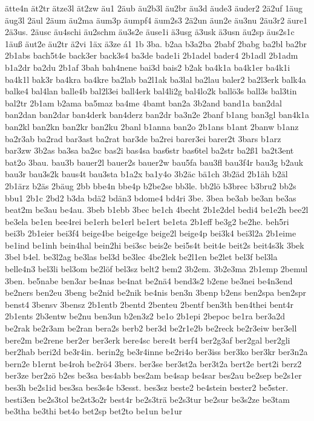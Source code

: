 {ätte4n
ät2tr
ätze3l
ät2zw
äu1
2äub
äu2b3l
äu2br
äu3d
äude3
äuder2
2ä2uf
1äug
äug3l
2äul
2äum
äu2ma
äum3p
äumpf4
äum2s3
2ä2un
äun2e
äu3nu
2äu3r2
äure1
2ä3us.
2äusc
äu4schi
äu2schm
äu3s2e
äuse1i
ä3usg
ä3usk
ä3usn
äu2sp
äus2s1c
1äuß
äut2e
äu2tr
ä2vi
1äx
ä3ze
á1
1b
3ba.
b2aa
b3a2ba
2babf
2babg
ba2bl
ba2br
2b1abs
bach5t4e
back3er
back3s4
ba3de
bade1i
2b1adel
bader4
2b1adl
2b1adm
b1a2dr
ba2du
2b1af
3bah
bah4nene
bai3d
bais2
b2ak
ba4k1a
ba4k1er
ba4k1i
ba4k1l
bak3r
ba4kra
ba4kre
ba2lab
ba2l1ak
ba3lal
ba2lau
baler2
ba2l3erk
balk4a
balke4
bal4lan
balle4b
bal2l3ei
ball4erk
bal4li2g
bal4lo2k
ballö3s
ball3s
bal3tin
bal2tr
2b1am
b2ama
ba5maz
ba4me
4bamt
ban2a
3b2and
band1a
ban2dal
ban2dan
ban2dar
ban4derk
ban4derz
ban2dr
ba3n2e
2banf
b1ang
ban3gl
ban4k1a
ban2kl
ban2kn
ban2kr
ban2ku
2banl
b1anna
ban2o
2b1ans
b1ant
2banw
b1anz
ba2r3ab
ba2rad
bar3ast
ba2rat
bar3de
ba2rei
barer3ei
barer2t
3bars
b1arz
bar3zw
3b2as
ba3sa
ba2sc
bas2i
bas4sa
bas6str
bas6tel
ba2str
ba2ß1
ba2t3ent
bat2o
3bau.
bau3b
bauer2l
bauer2s
bauer2w
bau5fa
bau3fl
bau3f4r
bau3g
b2auk
bau3r
bau3s2k
baus4t
bau3sta
b1a2x
ba1y4o
3b2äc
bä1ch
3b2äd
2b1äh
b2äl
2b1ärz
b2äs
2bäug
2bb
bbe4n
bbe4p
b2be2se
bb3le.
bb2lö
b3brec
b3bru2
bb2s
bbu1
2b1c
2bd2
b3da
bdä2
bdän3
bdome4
bd4ri
3be.
3bea
be3ab
be3an
be3as
beat2m
be3au
be4au.
3beb
b1ebb
3bec
be1ch
4becht
2b1e2del
bedi4
be1e2h
bee2l
be3ela
be1en
bee4rei
be1erh
be1erl
be1ert
be1eta
2b1eff
be3g2
be2he.
beh5ri
bei3b
2b1eier
bei3f4
beige4be
beige4ge
beige2l
beige4p
bei3k4
bei3l2a
2b1eime
be1ind
be1inh
bein4hal
bein2hi
bei3sc
beis2e
bei5s4t
beit4e
beit2s
beit4s3k
3bek
3bel
b4el.
be3l2ag
be3las
bel3d
be3lec
4be2lek
be2l1en
be2let
bel3f
bel3la
belle4n3
bel3li
bel3om
be2löf
bel3sz
belt2
bem2
3b2em.
3b2e3ma
2b1emp
2bemul
3ben.
be5nabe
ben3ar
be4nas
be4nat
be2nä4
bend3s2
b2ene
be3nei
be4n3end
be2ners
ben2eu
3beng
be2nid
be2nik
be4nis
ben3n
3benp
b2ens
ben2spa
ben2spr
benst4
3bensv
3bensz
2b1entb
2bentd
2benteu
2bentf
ben3th
ben4thei
bent4r
2b1ents
2b3entw
be2nu
ben3un
b2en3z2
be1o
2b1epi
2bepoc
be1ra
ber3a2d
be2rak
be2r3am
be2ran
bera2s
berb2
ber3d
be2r1e2b
be2reck
be2r3eiw
ber3ell
bere2m
be2rene
ber2er
ber3erk
bere4sc
bere4t
berf4
ber2g3af
ber2gal
ber2gli
ber2hab
beri2d
be3r4in.
berin2g
be3r4inne
be2ri4o
ber3iss
ber3ko
ber3kr
ber3n2a
bern2e
b1ernt
be4roh
be2rö4
3bers.
ber3se
ber3st2a
ber3t2a
bert2e
bert2i
berz2
ber3ze
ber2zö
b2es
be3sa
bes4abb
bes2am
be4sap
be4sar
bes2au
be2sep
be2s1er
bes3h
be2s1id
bes3sa
bes3s4e
b3esst.
bes3sz
beste2
be4stein
bester2
be5ster.
besti3en
be2s3tol
be2st3o2r
best4r
be2s3trä
be2s3tur
be2sur
be3s2ze
be3tam
be3tha
be3thi
bet4o
bet2sp
bet2to
be1un
be1ur
}
